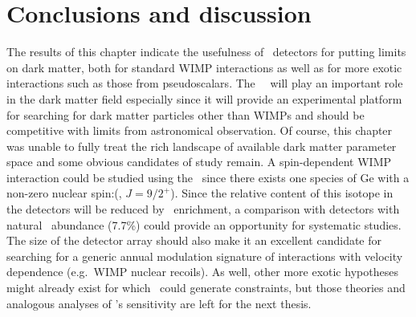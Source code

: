 	\section{Conclusions and discussion}
	\label{sec:OtherLowEnergyConclusions}	
	
	The results of this chapter indicate the usefulness of \ppc~detectors for
putting limits on dark matter, both for standard WIMP interactions as well as
for more exotic interactions such as those from pseudoscalars.  The
\MJ~\minmod~will play an important role in the dark matter field especially
since it will provide an experimental platform for searching for dark matter
particles other than WIMPs and should be competitive with limits from
astronomical observation.  Of course, this chapter was unable to fully treat
the rich landscape of available dark matter parameter space and some obvious
candidates of study remain.  A spin-dependent WIMP interaction could be studied
using the \minmod~since there exists one species of Ge with a non-zero nuclear
spin:(\gerseventhree, $J=9/2^{+}$).  Since the relative content of this isotope
in the detectors will be reduced by \gersevensix~enrichment, a comparison with
detectors with natural \gerseventhree~abundance (7.7\%) could provide an
opportunity for systematic studies.  The size of the detector array should also
make it an excellent candidate for searching for a generic annual modulation
signature of interactions with velocity dependence (e.g.~WIMP nuclear recoils).
As well, other more exotic hypotheses might already exist for which \MJ~could
generate constraints, but those theories and analogous analyses of \MJ's
sensitivity are left for the next thesis.
	
